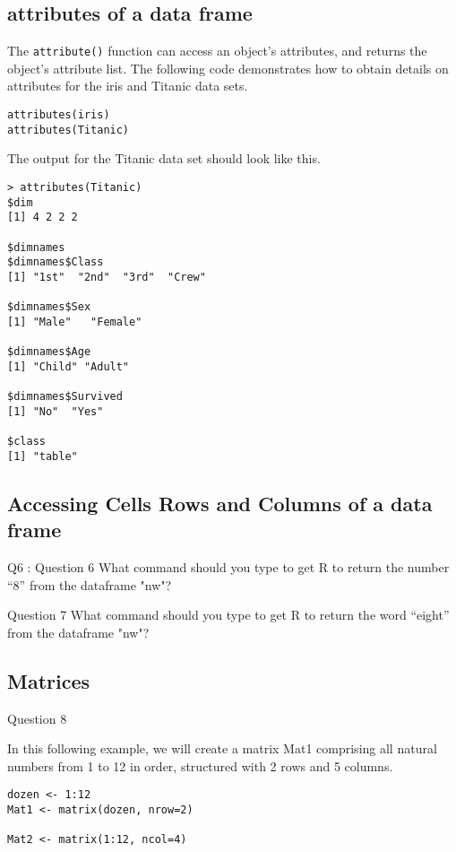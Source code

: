\documentclass[11pt]{article} %
\begin{document}
\subsection{attributes of a data frame}

The \texttt{attribute()} function can  access an object's attributes, and returns the object's attribute list. The following code demonstrates how to obtain details on attributes for the iris and Titanic data sets.
\begin{framed}
\begin{verbatim}
attributes(iris)
attributes(Titanic)

\end{verbatim}
\end{framed}
The output for the Titanic data set should look like this.
\begin{verbatim}
> attributes(Titanic)
$dim
[1] 4 2 2 2

$dimnames
$dimnames$Class
[1] "1st"  "2nd"  "3rd"  "Crew"

$dimnames$Sex
[1] "Male"   "Female"

$dimnames$Age
[1] "Child" "Adult"

$dimnames$Survived
[1] "No"  "Yes"

$class
[1] "table"
\end{verbatim}
\newpage
\subsection{Accessing Cells Rows and Columns of a data frame}
Q6 : Question 6
What command should you type to get R to return the number “8” from the dataframe "nw"?

Question 7
What command should you type to get R to return the word “eight” from the dataframe "nw"?

\subsection{Matrices}
Question 8

In this following example, we will 
create a matrix Mat1 comprising all natural numbers from 1 to 12 in order, structured with 2 rows and 5 columns.

\begin{verbatim}
dozen <- 1:12
Mat1 <- matrix(dozen, nrow=2)

Mat2 <- matrix(1:12, ncol=4)
\end{verbatim}
\end{document}
